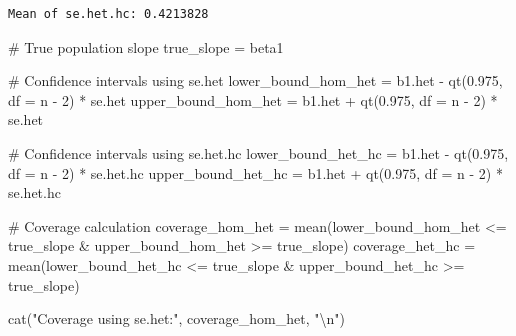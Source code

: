 \documentclass[
  11pt,
]{article}
\newenvironment{Shaded}{\begin{snugshade}}{\end{snugshade}}
\newcommand{\AttributeTok}[1]{\textcolor[rgb]{0.40,0.45,0.13}{#1}}
\newcommand{\CommentTok}[1]{\textcolor[rgb]{0.37,0.37,0.37}{#1}}
\newcommand{\DecValTok}[1]{\textcolor[rgb]{0.68,0.00,0.00}{#1}}
\newcommand{\FloatTok}[1]{\textcolor[rgb]{0.68,0.00,0.00}{#1}}
\newcommand{\FunctionTok}[1]{\textcolor[rgb]{0.28,0.35,0.67}{#1}}
\newcommand{\NormalTok}[1]{\textcolor[rgb]{0.00,0.23,0.31}{#1}}
\newcommand{\OtherTok}[1]{\textcolor[rgb]{0.00,0.23,0.31}{#1}}
\newcommand{\SpecialCharTok}[1]{\textcolor[rgb]{0.37,0.37,0.37}{#1}}
\newcommand{\StringTok}[1]{\textcolor[rgb]{0.13,0.47,0.30}{#1}}
\begin{document}
\begin{verbatim}
Mean of se.het.hc: 0.4213828 
\end{verbatim}

\begin{Shaded}
\begin{Highlighting}[]
\CommentTok{\# True population slope }
\NormalTok{true\_slope }\OtherTok{=}\NormalTok{ beta1}

\CommentTok{\# Confidence intervals using se.het}
\NormalTok{lower\_bound\_hom\_het }\OtherTok{=}\NormalTok{ b1.het }\SpecialCharTok{{-}} \FunctionTok{qt}\NormalTok{(}\FloatTok{0.975}\NormalTok{, }\AttributeTok{df =}\NormalTok{ n }\SpecialCharTok{{-}} \DecValTok{2}\NormalTok{) }\SpecialCharTok{*}\NormalTok{ se.het}
\NormalTok{upper\_bound\_hom\_het }\OtherTok{=}\NormalTok{ b1.het }\SpecialCharTok{+} \FunctionTok{qt}\NormalTok{(}\FloatTok{0.975}\NormalTok{, }\AttributeTok{df =}\NormalTok{ n }\SpecialCharTok{{-}} \DecValTok{2}\NormalTok{) }\SpecialCharTok{*}\NormalTok{ se.het}

\CommentTok{\# Confidence intervals using se.het.hc}
\NormalTok{lower\_bound\_het\_hc }\OtherTok{=}\NormalTok{ b1.het }\SpecialCharTok{{-}} \FunctionTok{qt}\NormalTok{(}\FloatTok{0.975}\NormalTok{, }\AttributeTok{df =}\NormalTok{ n }\SpecialCharTok{{-}} \DecValTok{2}\NormalTok{) }\SpecialCharTok{*}\NormalTok{ se.het.hc}
\NormalTok{upper\_bound\_het\_hc }\OtherTok{=}\NormalTok{ b1.het }\SpecialCharTok{+} \FunctionTok{qt}\NormalTok{(}\FloatTok{0.975}\NormalTok{, }\AttributeTok{df =}\NormalTok{ n }\SpecialCharTok{{-}} \DecValTok{2}\NormalTok{) }\SpecialCharTok{*}\NormalTok{ se.het.hc}

\CommentTok{\# Coverage calculation}
\NormalTok{coverage\_hom\_het }\OtherTok{=} \FunctionTok{mean}\NormalTok{(lower\_bound\_hom\_het }\SpecialCharTok{\textless{}=}\NormalTok{ true\_slope }\SpecialCharTok{\&}\NormalTok{ upper\_bound\_hom\_het }\SpecialCharTok{\textgreater{}=}\NormalTok{ true\_slope)}
\NormalTok{coverage\_het\_hc }\OtherTok{=} \FunctionTok{mean}\NormalTok{(lower\_bound\_het\_hc }\SpecialCharTok{\textless{}=}\NormalTok{ true\_slope }\SpecialCharTok{\&}\NormalTok{ upper\_bound\_het\_hc }\SpecialCharTok{\textgreater{}=}\NormalTok{ true\_slope)}

\FunctionTok{cat}\NormalTok{(}\StringTok{"Coverage using se.het:"}\NormalTok{, coverage\_hom\_het, }\StringTok{"}\SpecialCharTok{\textbackslash{}n}\StringTok{"}\NormalTok{)}
\end{Highlighting}
\end{Shaded}
\end{document}
